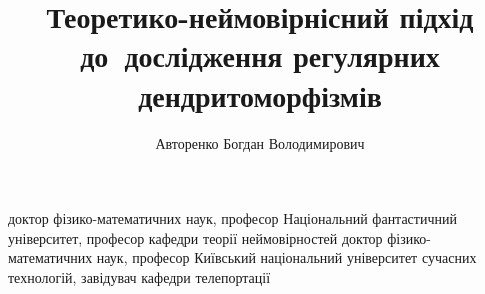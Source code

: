\documentclass{vakaref}
\begin{document}
\title{Теоретико-неймовірнісний підхід до~дослідження регулярних дендритоморфізмів}
\author{Авторенко Богдан Володимирович}
  {доктор фізико-математичних наук, професор}
  {Національний фантастичний університет,
   професор кафедри теорії неймовірностей}
  {доктор фізико-математичних наук, професор}
  {Київський національний університет сучасних технологій,
   завідувач кафедри телепортації}

\maketitle
\end{document}
